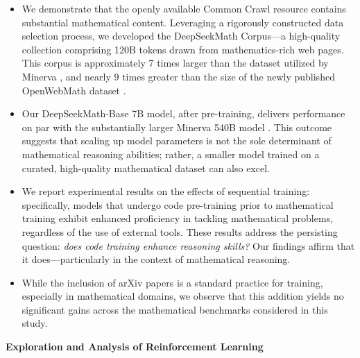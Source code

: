\begin{itemize}[topsep=0pt]
    \item We demonstrate that the openly available Common Crawl resource contains substantial mathematical content. Leveraging a rigorously constructed data selection process, we developed the DeepSeekMath Corpus—a high-quality collection comprising 120B tokens drawn from mathematics-rich web pages. This corpus is approximately 7 times larger than the dataset utilized by Minerva \citep{minerva}, and nearly 9 times greater than the size of the newly published OpenWebMath dataset \citep{openwebmath}.

    \item Our DeepSeekMath-Base 7B model, after pre-training, delivers performance on par with the substantially larger Minerva 540B model \citep{minerva}. This outcome suggests that scaling up model parameters is not the sole determinant of mathematical reasoning abilities; rather, a smaller model trained on a curated, high-quality mathematical dataset can also excel.

    \item We report experimental results on the effects of sequential training: specifically, models that undergo code pre-training prior to mathematical training exhibit enhanced proficiency in tackling mathematical problems, regardless of the use of external tools. These results address the persisting question: \textit{does code training enhance reasoning skills?} Our findings affirm that it does—particularly in the context of mathematical reasoning.

    \item While the inclusion of arXiv papers is a standard practice for training, especially in mathematical domains, we observe that this addition yields no significant gains across the mathematical benchmarks considered in this study.
\end{itemize}

\textbf{Exploration and Analysis of Reinforcement Learning}

